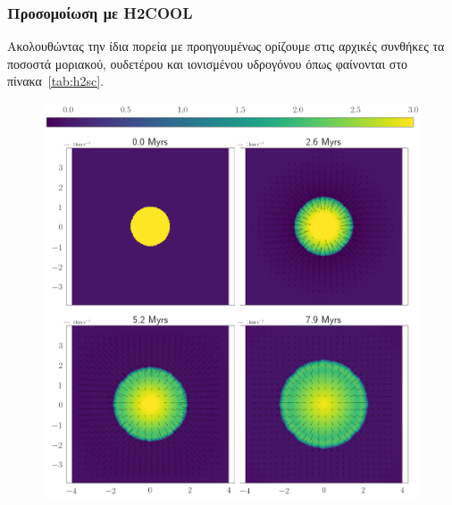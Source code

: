 
	\subsubsection{Προσομοίωση με H2COOL}


	Ακολουθώντας την ίδια πορεία με προηγουμένως ορίζουμε στις αρχικές συνθήκες τα ποσοστά μοριακού, ουδετέρου και ιονισμένου υδρογόνου όπως φαίνονται στο πίνακα~\ref{tab:h2sc}.
	

	
\begin{figure}[h]
	\centering
	\includegraphics[width=1\linewidth]{DataImages/H2CoolingRHOquad}
	\caption{}
	\label{fig:h2coolingrhoquad}
\end{figure}

